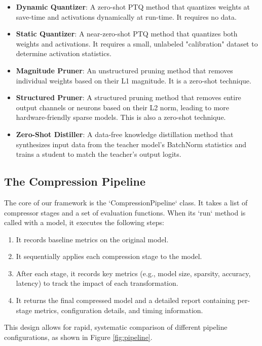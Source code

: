 \documentclass[sigconf]{acmart}
\begin{document}
\begin{itemize}
    \item \textbf{Dynamic Quantizer}: A zero-shot PTQ method that quantizes weights at save-time and activations dynamically at run-time. It requires no data.
    \item \textbf{Static Quantizer}: A near-zero-shot PTQ method that quantizes both weights and activations. It requires a small, unlabeled "calibration" dataset to determine activation statistics.
    \item \textbf{Magnitude Pruner}: An unstructured pruning method that removes individual weights based on their L1 magnitude. It is a zero-shot technique.
    \item \textbf{Structured Pruner}: A structured pruning method that removes entire output channels or neurons based on their L2 norm, leading to more hardware-friendly sparse models. This is also a zero-shot technique.
    \item \textbf{Zero-Shot Distiller}: A data-free knowledge distillation method that synthesizes input data from the teacher model's BatchNorm statistics and trains a student to match the teacher's output logits.
\end{itemize}

\subsection{The Compression Pipeline}
The core of our framework is the `CompressionPipeline` class. It takes a list of compressor stages and a set of evaluation functions. When its `run` method is called with a model, it executes the following steps:
\begin{enumerate}
    \item It records baseline metrics on the original model.
    \item It sequentially applies each compression stage to the model.
    \item After each stage, it records key metrics (e.g., model size, sparsity, accuracy, latency) to track the impact of each transformation.
    \item It returns the final compressed model and a detailed report containing per-stage metrics, configuration details, and timing information.
\end{enumerate}
This design allows for rapid, systematic comparison of different pipeline configurations, as shown in Figure \ref{fig:pipeline}.

\end{document}
